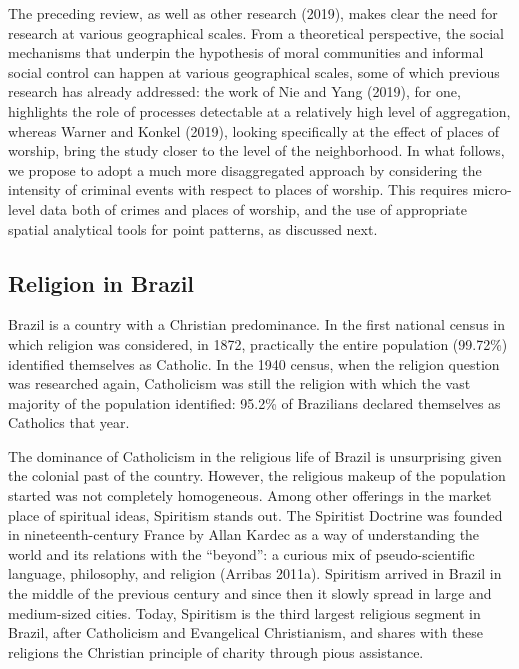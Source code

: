 \documentclass[smallextended]{svjour3}       %
\begin{document}
The preceding review, as well as other research (2019), makes clear the
need for research at various geographical scales. From a theoretical
perspective, the social mechanisms that underpin the hypothesis of moral
communities and informal social control can happen at various
geographical scales, some of which previous research has already
addressed: the work of Nie and Yang (2019), for one, highlights the role
of processes detectable at a relatively high level of aggregation,
whereas Warner and Konkel (2019), looking specifically at the effect of
places of worship, bring the study closer to the level of the
neighborhood. In what follows, we propose to adopt a much more
disaggregated approach by considering the intensity of criminal events
with respect to places of worship. This requires micro-level data both
of crimes and places of worship, and the use of appropriate spatial
analytical tools for point patterns, as discussed next.

\hypertarget{religion-in-brazil}{%
\subsection{Religion in Brazil}\label{religion-in-brazil}}

Brazil is a country with a Christian predominance. In the first national
census in which religion was considered, in 1872, practically the entire
population (99.72\%) identified themselves as Catholic. In the 1940
census, when the religion question was researched again, Catholicism was
still the religion with which the vast majority of the population
identified: 95.2\% of Brazilians declared themselves as Catholics that
year.

The dominance of Catholicism in the religious life of Brazil is
unsurprising given the colonial past of the country. However, the
religious makeup of the population started was not completely
homogeneous. Among other offerings in the market place of spiritual
ideas, Spiritism stands out. The Spiritist Doctrine was founded in
nineteenth-century France by Allan Kardec as a way of understanding the
world and its relations with the ``beyond'': a curious mix of
pseudo-scientific language, philosophy, and religion (Arribas 2011a).
Spiritism arrived in Brazil in the middle of the previous century and
since then it slowly spread in large and medium-sized cities. Today,
Spiritism is the third largest religious segment in Brazil, after
Catholicism and Evangelical Christianism, and shares with these
religions the Christian principle of charity through pious assistance.
\end{document}
